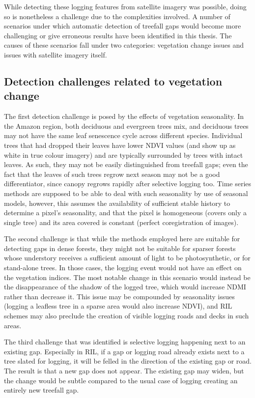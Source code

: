 \documentclass[a4paper,12pt]{scrbook}
\begin{document}
While detecting these logging features from satellite imagery was possible, doing so is nonetheless a challenge due to the complexities involved. A number of scenarios under which automatic detection of treefall gaps would become more challenging or give erroneous results have been identified in this thesis. The causes of these scenarios fall under two categories: vegetation change issues and issues with satellite imagery itself.

\subsection{Detection challenges related to vegetation change}

The first detection challenge is posed by the effects of vegetation seasonality. In the Amazon region, both deciduous and evergreen trees mix, and deciduous trees may not have the same leaf senescence cycle across different species. Individual trees that had dropped their leaves have lower \ac{NDVI} values (and show up as white in true colour imagery) and are typically surrounded by trees with intact leaves. As such, they may not be easily distinguished from treefall gaps; even the fact that the leaves of such trees regrow next season may not be a good differentiator, since canopy regrows rapidly after selective logging too. Time series methods are supposed to be able to deal with such seasonality by use of seasonal models, however, this assumes the availability of sufficient stable history to determine a pixel's seasonality, and that the pixel is homogeneous (covers only a single tree) and its area covered is constant (perfect coregistration of images).

The second challenge is that while the methods employed here are suitable for detecting gaps in dense forests, they might not be suitable for sparser forests whose understory receives a sufficient amount of light to be photosynthetic, or for stand-alone trees. In those cases, the logging event would not have an effect on the vegetation indices. The most notable change in this scenario would instead be the disappearance of the shadow of the logged tree, which would increase \ac{NDMI} rather than decrease it. This issue may be compounded by seasonality issues (logging a leafless tree in a sparse area would also increase \ac{NDVI}), and \ac{RIL} schemes may also preclude the creation of visible logging roads and decks in such areas.

The third challenge that was identified is selective logging happening next to an existing gap. Especially in \ac{RIL}, if a gap or logging road already exists next to a tree slated for logging, it will be felled in the direction of the existing gap or road. The result is that a new gap does not appear. The existing gap may widen, but the change would be subtle compared to the usual case of logging creating an entirely new treefall gap.
\end{document}
